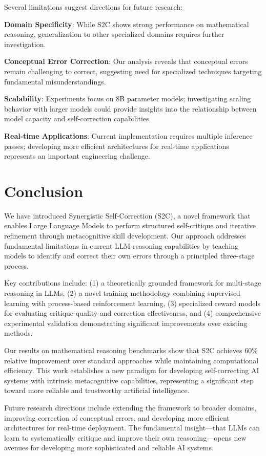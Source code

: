 \documentclass[10pt,twocolumn]{article}
\newcommand{\ssc}{\textsc{S2C}}
\begin{document}
Several limitations suggest directions for future research:

\textbf{Domain Specificity}: While \ssc{} shows strong performance on mathematical reasoning, generalization to other specialized domains requires further investigation.

\textbf{Conceptual Error Correction}: Our analysis reveals that conceptual errors remain challenging to correct, suggesting need for specialized techniques targeting fundamental misunderstandings.

\textbf{Scalability}: Experiments focus on 8B parameter models; investigating scaling behavior with larger models could provide insights into the relationship between model capacity and self-correction capabilities.

\textbf{Real-time Applications}: Current implementation requires multiple inference passes; developing more efficient architectures for real-time applications represents an important engineering challenge.

\section{Conclusion}

We have introduced Synergistic Self-Correction (\ssc{}), a novel framework that enables Large Language Models to perform structured self-critique and iterative refinement through metacognitive skill development. Our approach addresses fundamental limitations in current LLM reasoning capabilities by teaching models to identify and correct their own errors through a principled three-stage process.

Key contributions include: (1) a theoretically grounded framework for multi-stage reasoning in LLMs, (2) a novel training methodology combining supervised learning with process-based reinforcement learning, (3) specialized reward models for evaluating critique quality and correction effectiveness, and (4) comprehensive experimental validation demonstrating significant improvements over existing methods.

Our results on mathematical reasoning benchmarks show that \ssc{} achieves 60\% relative improvement over standard approaches while maintaining computational efficiency. This work establishes a new paradigm for developing self-correcting AI systems with intrinsic metacognitive capabilities, representing a significant step toward more reliable and trustworthy artificial intelligence.

Future research directions include extending the framework to broader domains, improving correction of conceptual errors, and developing more efficient architectures for real-time deployment. The fundamental insight—that LLMs can learn to systematically critique and improve their own reasoning—opens new avenues for developing more sophisticated and reliable AI systems.
\end{document}

